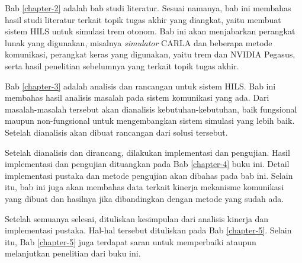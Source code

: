 Bab \ref{chapter-2} adalah bab studi literatur. Sesuai namanya, bab ini membahas
hasil studi literatur terkait topik tugas akhir yang diangkat, yaitu membuat
sistem HILS untuk simulasi trem otonom. Bab ini akan menjabarkan perangkat lunak
yang digunakan, misalnya \textit{simulator} CARLA dan beberapa metode
komunikasi, perangkat keras yang digunakan, yaitu trem dan NVIDIA Pegasus, serta
hasil penelitian sebelumnya yang terkait topik tugas akhir.

Bab \ref{chapter-3} adalah analisis dan rancangan untuk sistem HILS. Bab ini
membahas hasil analisis masalah pada sistem komunikasi yang ada. Dari
masalah-masalah tersebut akan dianalisis kebutuhan-kebutuhan, baik fungsional
maupun non-fungsional untuk mengembangkan sistem simulasi yang lebih baik.
Setelah dianalisis akan dibuat rancangan dari solusi tersebut.

Setelah dianalisis dan dirancang, dilakukan implementasi dan pengujian. Hasil
implementasi dan pengujian dituangkan pada Bab \ref{chapter-4} buku ini. Detail
implementasi pustaka dan metode pengujian akan dibahas pada bab ini. Selain itu,
bab ini juga akan membahas data terkait kinerja mekanisme komunikasi
yang dibuat dan hasilnya jika dibandingkan dengan metode yang sudah ada.

Setelah semuanya selesai, dituliskan kesimpulan dari analisis kinerja dan
implementasi pustaka. Hal-hal tersebut dituliskan pada Bab \ref{chapter-5}.
Selain itu, Bab \ref{chapter-5} juga terdapat saran untuk memperbaiki ataupun
melanjutkan penelitian dari buku ini.
